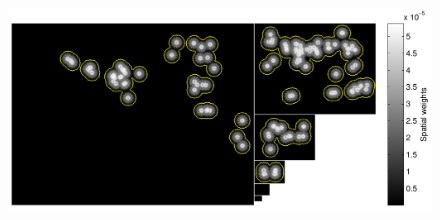 \documentclass[thesis.tex]{subfiles}
\begin{document}
\begin{figure}[H]
    \centering
    \includegraphics[width=\textwidth]{img/cellHistScaleSpacesSpatialWeights.pdf}
    \caption{}
    \label{fig:cellHistScaleSpacesSpatialWeights}
\end{figure}
%
\end{document}
